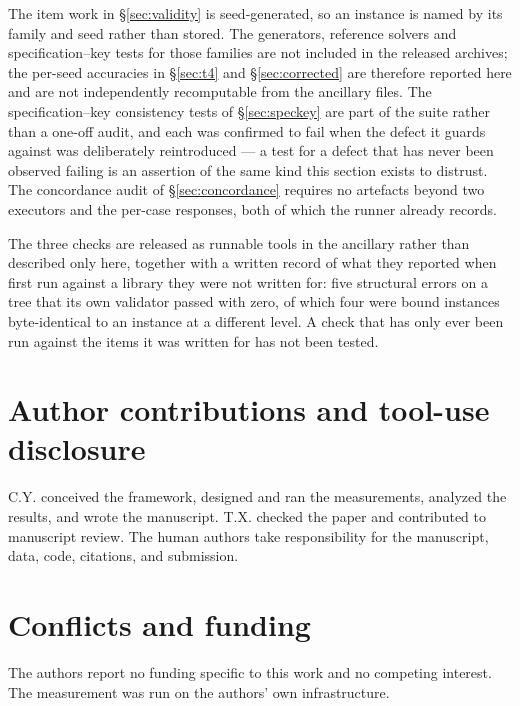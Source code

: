 The item work in \S\ref{sec:validity} is seed-generated, so an instance is named by its family and seed rather than stored. The generators, reference solvers and specification--key tests for those families are not included in the released archives; the per-seed accuracies in \S\ref{sec:t4} and \S\ref{sec:corrected} are therefore reported here and are not independently recomputable from the ancillary files. The specification--key consistency tests of \S\ref{sec:speckey} are part of the suite rather than a one-off audit, and each was confirmed to fail when the defect it guards against was deliberately reintroduced --- a test for a defect that has never been observed failing is an assertion of the same kind this section exists to distrust. The concordance audit of \S\ref{sec:concordance} requires no artefacts beyond two executors and the per-case responses, both of which the runner already records.

The three checks are released as runnable tools in the ancillary  rather than described only here, together with a written record of what they reported when first run against a library they were not written for: five structural errors on a tree that its own validator passed with zero, of which four were bound instances byte-identical to an instance at a different level. A check that has only ever been run against the items it was written for has not been tested.

\section*{Author contributions and tool-use disclosure}

C.Y. conceived the framework, designed and ran the measurements, analyzed the results, and wrote the manuscript. T.X. checked the paper and contributed to manuscript review. The human authors take responsibility for the manuscript, data, code, citations, and submission.

\section*{Conflicts and funding}

The authors report no funding specific to this work and no competing interest. The measurement was run on the authors' own infrastructure.




\appendix

